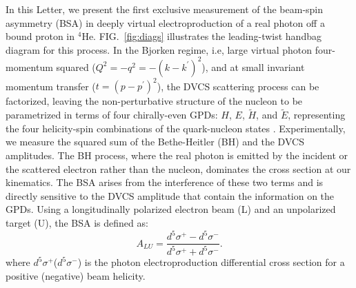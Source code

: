 \documentclass[twocolumn,nofootinbib,showpacs,prl,superscriptaddress,secnumarabic,amssymb,nobibnotes,aps,floatfix]{revtex4}
\begin{document}
In this Letter, we present the first exclusive measurement of the beam-spin 
asymmetry (BSA) in deeply virtual electroproduction of a real photon off a bound 
proton in $^{4}$He. FIG.~\ref{fig:diags} illustrates the leading-twist handbag 
diagram for this process. In the Bjorken regime, i.e, large virtual photon 
four-momentum squared ($Q^{2}=-q^2=-(k-k^\prime)^2$), and at small invariant 
momentum transfer ($t=(p-p^\prime)^2$), the DVCS scattering process can be 
factorized, leaving the non-perturbative structure of the nucleon to be 
parametrized in terms of four chirally-even GPDs: $H$, $E$, $\widetilde{H}$, 
and $\widetilde{E}$, representing the four helicity-spin combinations of the 
quark-nucleon states \cite{Freund_Collins,Ji_Osborne}. Experimentally, we 
measure the squared sum of the Bethe-Heitler (BH) and the DVCS amplitudes. The 
BH process, where the real photon is emitted by the incident or the scattered 
electron rather than the nucleon, dominates the cross section at our 
kinematics. The BSA arises from the interference of these two terms and is 
directly sensitive to the DVCS amplitude that contain the information on the 
GPDs. Using a longitudinally polarized electron beam (L) and an unpolarized 
target (U), the BSA is defined as:
\begin{equation}
  A_{LU} = \frac{d^{5}\sigma^{+} - d^{5}\sigma^{-} }
                {d^{5}\sigma^{+} + d^{5}\sigma^{-}}.
    \label{BSA_equation}
  \end{equation}
where $d^{5}\sigma^{+}$($d^{5}\sigma^{-}$) is the photon electroproduction 
differential cross section for a positive (negative) beam helicity. 
\end{document}
